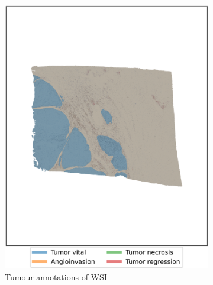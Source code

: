 \begin{figure}[h!t]
    \centering
     \begin{subfigure}[b]{0.475\textwidth}
         \centering
         \includegraphics[width=\textwidth]{latex/captum/case13/masks_case13-stain41-dead_2415days.png}
         \caption{Tumour annotations of WSI}
     \end{subfigure}
    \hfill
     \begin{subfigure}[b]{0.49\textwidth}
         \centering

\end{subfigure}
\end{figure}

